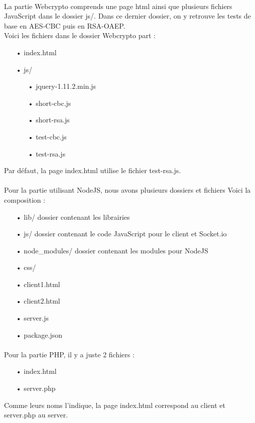 \documentclass[a4paper,12pt]{report}
\begin{document}
	\paragraph*{}
	La partie Webcrypto comprends une page html ainsi que plusieurs fichiers JavaScript dans le dossier js/. Dans ce dernier dossier, on y retrouve les tests de base en AES-CBC puis en RSA-OAEP.\\
	Voici les fichiers dans le dossier Webcrypto part : \\
	\begin{itemize}
		\item[•]index.html
		\item[•]js/
		\begin{itemize}
			\item[•]jquery-1.11.2.min.js
			\item[•]short-cbc.js
			\item[•]short-rsa.js
			\item[•]test-cbc.js
			\item[•]test-rsa.js
		\end{itemize}
	\end{itemize}
	Par défaut, la page index.html utilise le fichier test-rsa.js.
	\paragraph*{}
	Pour la partie utilisant NodeJS, nous avons plusieurs dossiers et fichiers
	Voici la composition :\\
	\begin{itemize}
		\item[•]lib/ \hspace{72px} dossier contenant les librairies
		\item[•]js/ \hspace{80px} dossier contenant le code JavaScript pour le client et Socket.io
		\item[•]node\_modules/ \hspace{10px} dossier contenant les modules pour NodeJS
		\item[•]css/
		\item[•]client1.html
		\item[•]client2.html
		\item[•]server.js
		\item[•]package.json
	\end{itemize}
	\paragraph*{}
	Pour la partie PHP, il y a juste 2 fichiers : \\
	\begin{itemize}
		\item[•]index.html
		\item[•]server.php
	\end{itemize}
	Comme leurs noms l'indique, la page index.html correspond au client et server.php au server.
\end{document}
